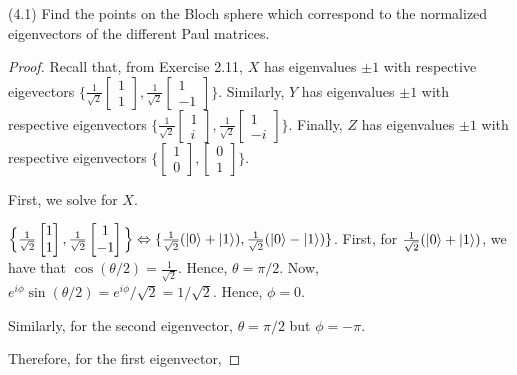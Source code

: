 \documentclass[main.tex]{subfiles}
\begin{document}
\begin{subappendices}
\begin{exercise} (4.1) Find the points on the Bloch sphere which correspond to the normalized eigenvectors of the different Paul matrices. 
\begin{proof}
	
Recall that, from Exercise 2.11, $X$ has eigenvalues $\pm 1$ with respective eigevectors $\Big\{ \frac{1}{\sqrt{2}}\begin{bmatrix} 1 \\ 1 \end{bmatrix}, \frac{1}{\sqrt{2}}\begin{bmatrix} 1 \\ -1 \end{bmatrix} \Big\}$. Similarly, $Y$ has eigenvalues $\pm 1$ with respective eigenvectors $\Big\{ \frac{1}{\sqrt{2}}\begin{bmatrix} 1 \\ i \end{bmatrix} , \frac{1}{\sqrt{2}} \begin{bmatrix} 1 \\ -i \end{bmatrix} \Big\}$. Finally, $Z$ has eigenvalues $\pm 1$ with respective eigenvectors $\Big\{ \begin{bmatrix} 1 \\ 0 \end{bmatrix} , \begin{bmatrix} 0 \\ 1 \end{bmatrix} \Big\}$.
	
First, we solve for $X$. 
	
$\Big\{ \frac{1}{\sqrt{2}}\begin{bmatrix} 1 \\ 1 \end{bmatrix}, \frac{1}{\sqrt{2}}\begin{bmatrix} 1 \\ -1 \end{bmatrix} \Big\} \Leftrightarrow \{ \frac{1}{\sqrt{2}}(\ket{0} + \ket{1}) , \frac{1}{\sqrt{2}}(\ket{0} - \ket{1}) \} $. First, for $\frac{1}{\sqrt{2}}(\ket{0} + \ket{1})$, we have that $\cos(\theta / 2) = \frac{1}{\sqrt{2}}$. Hence, $\theta = \pi / 2$. Now, $e^{i\phi} \sin (\theta / 2) = e^{i \phi} / \sqrt{2} = 1 / \sqrt{2}$. Hence, $\phi = 0$. 
	
Similarly, for the second eigenvector, $\theta = \pi / 2$ but $\phi = - \pi$.
	
Therefore, for the first eigenvector, 
	

\end{proof}
\end{exercise}
\end{subappendices}
\end{document}
